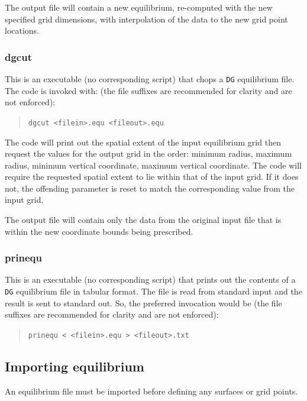 \documentclass[a4paper,10pt]{report}
\begin{document}
The output file will contain a new equilibrium, re-computed with
the new specified grid dimensions, with interpolation of the data
to the new grid point locations.

\subsubsection{dgcut}

This is an executable (no corresponding script) that chops a
{\tt DG} equilibrium file. The code is invoked with:
(the file suffixes are recommended for clarity
and are not enforced):
\begin{quote}
{\tt dgcut <filein>.equ <fileout>.equ}
\end{quote}

The code will print out the spatial extent of the input
equilibrium grid then request the values for the output grid in the
order: minimum radius, maximum radius,
minimum vertical coordinate, maximum vertical coordinate.
The code
will require the requested spatial extent to lie within that of the
input grid.  If it does not, the offending parameter is reset to
match the corresponding value from the input grid.

The output file will contain only the data from the original
input file that is within the new coordinate bounds being prescribed.

\subsubsection{prinequ}

This is an executable (no corresponding script) that prints out the
contents of a {\tt DG} equilibrium file in tabular format.  The file
is read from standard input and the result is sent to standard out.
So, the preferred invocation would be
(the file suffixes are recommended for clarity
and are not enforced):
\begin{quote}
{\tt prinequ < <filein>.equ > <fileout>.txt}
\end{quote}

\subsection{Importing equilibrium}

An equilibrium file must be imported before defining any surfaces or
grid points.
\end{document}
